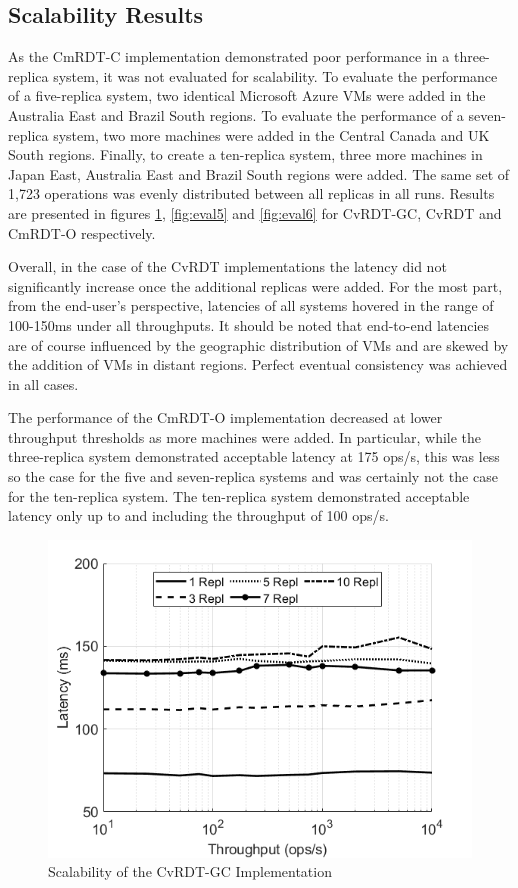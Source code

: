 \documentclass[sigconf,nonacm,10pt]{acmart}
\begin{document}
\subsection{Scalability Results}
As the CmRDT-C implementation demonstrated poor performance in a three-replica system, it was not evaluated for scalability. To evaluate the performance of a five-replica system, two identical Microsoft Azure VMs were added in the Australia East and Brazil South regions. To evaluate the performance of a seven-replica system, two more machines were added in the Central Canada and UK South regions. Finally, to create a ten-replica system, three more machines in Japan East, Australia East and Brazil South regions were added. The same set of 1,723 operations was evenly distributed between all replicas in all runs. Results are presented in figures \ref{fig:eval4}, \ref{fig:eval5} and \ref{fig:eval6} for CvRDT-GC, CvRDT and CmRDT-O respectively.

Overall, in the case of the CvRDT implementations the latency did not significantly increase once the additional replicas were added. For the most part, from the end-user's perspective, latencies of all systems hovered in the range of 100-150ms under all throughputs. It should be noted that end-to-end latencies are of course influenced by the geographic distribution of VMs and are skewed by the addition of VMs in distant regions. Perfect eventual consistency was achieved in all cases.

The performance of the CmRDT-O implementation decreased at lower throughput thresholds as more machines were added. In particular, while the three-replica system demonstrated acceptable latency at 175 ops/s, this was less so the case for the five and seven-replica systems and was certainly not the case for the ten-replica system. The ten-replica system demonstrated acceptable latency only up to and including the throughput of 100 ops/s.

\begin{figure}[h]
  \centering
  \includegraphics[width=\linewidth]{Fig10SCvRDTGC}
  \caption{Scalability of the CvRDT-GC Implementation}
  \label{fig:eval4}
\end{figure}
\end{document}
